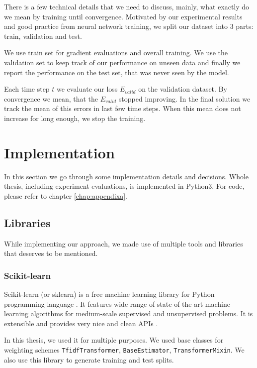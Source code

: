     There is a few technical details that we need to discuss, 
    mainly, what exactly do we mean by training until convergence.
    Motivated by our experimental results and good practice from neural network training,
    we split our dataset into $3$ parts: train, validation and test.
    
    We use train set for gradient evaluations and overall training. 
    We use the validation set to keep track of our performance on unseen data and finally we report the performance on the test set, that was never seen by the model.
    
    Each time step $t$ we evaluate our loss $E_{valid}$ on the validation dataset.
    By convergence we mean, that the $E_{valid}$ stopped improving.
    In the final solution we track the mean of this errors in last few time steps.
    When this mean does not increase for long enough, we stop the training.

\section{Implementation}
    
    In this section we go through some implementation details and decisions.
    Whole thesis, including experiment evaluations, is implemented in Python3.
    For code, please refer to chapter \ref{chap:appendixa}.

    \subsection{Libraries} 

    While implementing our approach, we made use of multiple tools and libraries that deserves to be mentioned.

    \subsubsection{Scikit-learn}
    
    Scikit-learn (or sklearn) is a free machine learning library for Python programming language \cite{scikit-learn}.
    It features wide range of state-of-the-art machine learning algorithms for medium-scale supervised and unsupervised problems.
    It is extensible and provides very nice and clean APIs \cite{sklearn_api}.
    
    In this thesis, we used it for multiple purposes.
    We used base classes for weighting schemes \texttt{TfidfTransformer}, \texttt{BaseEstimator}, \texttt{TransformerMixin}.
    We also use this library to generate training and test splits. 
    
